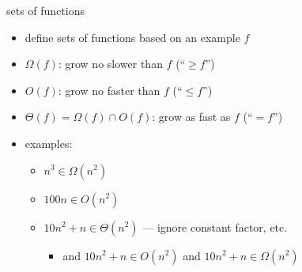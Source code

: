 \begin{frame}{sets of functions}
\begin{itemize}
\item define sets of functions based on an example $f$
\vspace{.5cm}
\item $\Omega(f)$: grow no slower than $f$ (``$\ge f$'')
\item $O(f)$: grow no faster than $f$ (``$\le f$'')
\item $\Theta(f) = \Omega(f) \cap O(f)$: grow as fast as $f$ (``$= f$'')
\vspace{.5cm}
\item<2-> examples:
    \begin{itemize}
        \item $n^3 \in \Omega(n^2)$ 
        \item $100n \in O(n^2)$ 
        \item $10n^2+n \in \Theta(n^2)$ --- ignore constant factor, etc.
            \begin{itemize}
            \item and $10n^2+n \in O(n^2)$ and $10n^2+n \in \Omega(n^2)$
            \end{itemize}
    \end{itemize}
\end{itemize}
\end{frame}
